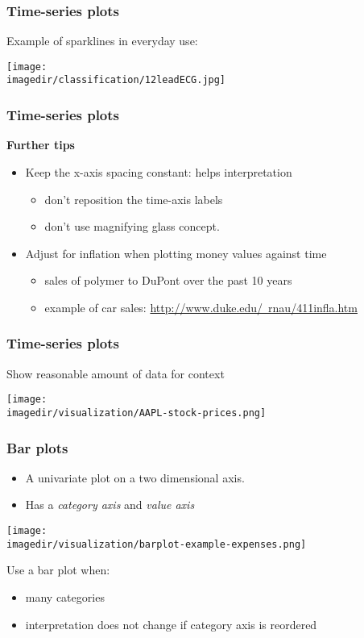 \begin{frame}\frametitle{Time-series plots}
	Example of sparklines in everyday use:
	\begin{center}
		\texttt{[image: \\imagedir/classification/12leadECG.jpg]}
	\end{center}
\end{frame}

\begin{frame}\frametitle{Time-series plots}
	
	\textbf{Further tips}
	\begin{itemize}
		\item	Keep the x-axis spacing constant: helps interpretation 
		\begin{itemize}
			\item	don't reposition the time-axis labels 
			\item	don't use magnifying glass concept. 
		\end{itemize}
	\end{itemize}
	\begin{itemize}
		\item	Adjust for inflation when plotting money values against time 
		\begin{itemize}
			\item	sales of polymer to DuPont over the past 10 years 
			\item	example of car sales: \href{http://www.duke.edu/~rnau/411infla.htm}{http://www.duke.edu/~rnau/411infla.htm} 
		\end{itemize}
	\end{itemize}
\end{frame}

\begin{frame}\frametitle{Time-series plots}
	
	Show reasonable amount of data for context 
	\begin{center}
		\texttt{[image: \\imagedir/visualization/AAPL-stock-prices.png]}
	\end{center}
\end{frame}

\begin{frame}\frametitle{Bar plots}
	\begin{itemize}
		\item	A univariate plot on a two dimensional axis. 
		\item	Has a \emph{category axis} and \emph{value axis} 
	\end{itemize}
	\begin{center}
		\texttt{[image: \\imagedir/visualization/barplot-example-expenses.png]}
	\end{center}
	Use a bar plot when: 
	\begin{itemize}
		\item	many categories 
		\item	interpretation does not change if category axis is reordered 
	\end{itemize}
\end{frame}

